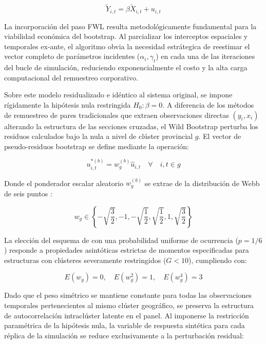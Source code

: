 \begin{equation}
    \tilde{Y}_{i,t} = \beta \tilde{X}_{i,t} + u_{i,t}
    \label{eq:fwl_residual}
\end{equation}

La incorporaci\'on del paso FWL resulta metodol\'ogicamente fundamental para la viabilidad econ\'omica del bootstrap. Al parcializar los interceptos espaciales y temporales ex-ante, el algoritmo obvia la necesidad estr\'ategica de reestimar el vector completo de par\'ametros incidentes ($\alpha_i, \gamma_t$) en cada una de las iteraciones del bucle de simulaci\'on, reduciendo exponencialmente el costo y la alta carga computacional del remuestreo corporativo.

Sobre este modelo residualizado e id\'entico al sistema original, se impone r\'igidamente la hip\'otesis nula restringida $H_0: \beta = 0$. A diferencia de los m\'etodos de remuestreo de pares tradicionales que extraen observaciones directas $(y_i, x_i)$ alterando la estructura de las secciones cruzadas, el Wild Bootstrap perturba los residuos calculados bajo la nula a nivel de cl\'uster provincial $g$. El vector de pseudo-residuos bootstrap se define mediante la operaci\'on:

\begin{equation}
    u_{i,t}^{*(b)} = w_g^{(b)} \hat{u}_{i,t} \quad \forall \quad i,t \in g
\end{equation}

Donde el ponderador escalar aleatorio $w_g^{(b)}$ se extrae de la distribuci\'on de Webb de seis puntos \citep{mackinnon2020randomization}:

\begin{equation}
    w_g \in \left\{ -\sqrt{\frac{3}{2}}, -1, -\sqrt{\frac{1}{2}}, \sqrt{\frac{1}{2}}, 1, \sqrt{\frac{3}{2}} \right\}
\end{equation}

La elecci\'on del esquema de \citep{webb2014reworking} con una probabilidad uniforme de ocurrencia ($p = 1/6$) responde a propiedades asint\'oticas estrictas de momentos especificadas para estructuras con cl\'usteres severamente restringidos ($G < 10$), cumpliendo con:

\begin{equation}
    \textit{$E$}(w_g) = 0, \quad \textit{$E$}(w_g^2) = 1, \quad \textit{$E$}(w_g^4) = 3
\end{equation}

Dado que el peso sim\'etrico se mantiene constante para todas las observaciones temporales pertenecientes al mismo cl\'uster geogr\'afico, se preserva la estructura de autocorrelaci\'on intracl\'uster latente en el panel. Al imponerse la restricci\'on param\'etrica de la hip\'otesis nula, la variable de respuesta sint\'etica para cada r\'eplica de la simulaci\'on se reduce exclusivamente a la perturbaci\'on residual:

